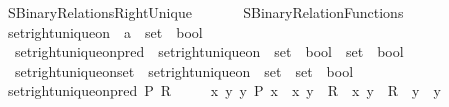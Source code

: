 %
\begin{isabellebody}%
%
%
\isadelimdocument
%
\endisadelimdocument
%
\isatagdocument
%
\isamarkuptrue%
%
\endisatagdocument
{\isafolddocument}%
%
\isadelimdocument
%
\endisadelimdocument
%
\isadelimtheory
%
\endisadelimtheory
%
\isatagtheory
{}\isamarkupfalse%
\ SBinary{\isacharunderscore}{\kern0pt}Relations{\isacharunderscore}{\kern0pt}Right{\isacharunderscore}{\kern0pt}Unique\isanewline
\ \ \isanewline
\ \ \ \ SBinary{\isacharunderscore}{\kern0pt}Relation{\isacharunderscore}{\kern0pt}Functions\isanewline
{}%
\endisatagtheory
{\isafoldtheory}%
%
\isadelimtheory
\isanewline
%
\endisadelimtheory
\isanewline
{}\isamarkupfalse%
\ set{\isacharunderscore}{\kern0pt}right{\isacharunderscore}{\kern0pt}unique{\isacharunderscore}{\kern0pt}on\ {\isacharcolon}{\kern0pt}{\isacharcolon}{\kern0pt}\ {\isachardoublequoteopen}{\isacharprime}{\kern0pt}a\ {\isasymRightarrow}\ set\ {\isasymRightarrow}\ bool{\isachardoublequoteclose}\isanewline
\isanewline
{}\isamarkupfalse%
\isanewline
\ \ set{\isacharunderscore}{\kern0pt}right{\isacharunderscore}{\kern0pt}unique{\isacharunderscore}{\kern0pt}on{\isacharunderscore}{\kern0pt}pred\ {\isasymequiv}\ {\isachardoublequoteopen}set{\isacharunderscore}{\kern0pt}right{\isacharunderscore}{\kern0pt}unique{\isacharunderscore}{\kern0pt}on\ {\isacharcolon}{\kern0pt}{\isacharcolon}{\kern0pt}\ {\isacharparenleft}{\kern0pt}set\ {\isasymRightarrow}\ bool{\isacharparenright}{\kern0pt}\ {\isasymRightarrow}\ set\ {\isasymRightarrow}\ bool{\isachardoublequoteclose}\isanewline
\ \ set{\isacharunderscore}{\kern0pt}right{\isacharunderscore}{\kern0pt}unique{\isacharunderscore}{\kern0pt}on{\isacharunderscore}{\kern0pt}set\ {\isasymequiv}\ {\isachardoublequoteopen}set{\isacharunderscore}{\kern0pt}right{\isacharunderscore}{\kern0pt}unique{\isacharunderscore}{\kern0pt}on\ {\isacharcolon}{\kern0pt}{\isacharcolon}{\kern0pt}\ set\ {\isasymRightarrow}\ set\ {\isasymRightarrow}\ bool{\isachardoublequoteclose}\isanewline
{}\isanewline
\ \ \isamarkupfalse%
\ {\isachardoublequoteopen}set{\isacharunderscore}{\kern0pt}right{\isacharunderscore}{\kern0pt}unique{\isacharunderscore}{\kern0pt}on{\isacharunderscore}{\kern0pt}pred\ P\ R\ {\isasymequiv}\isanewline
\ \ \ \ {\isasymforall}x\ y\ y{\isacharprime}{\kern0pt}{\isachardot}{\kern0pt}\ P\ x\ {\isasymand}\ {\isasymlangle}x{\isacharcomma}{\kern0pt}\ y{\isasymrangle}\ {\isasymin}\ R\ {\isasymand}\ {\isasymlangle}x{\isacharcomma}{\kern0pt}\ y{\isacharprime}{\kern0pt}{\isasymrangle}\ {\isasymin}\ R\ {\isasymlongrightarrow}\ y\ {\isacharequal}{\kern0pt}\ y{\isacharprime}{\kern0pt}{\isachardoublequoteclose}\isanewline

\end{isabellebody}
